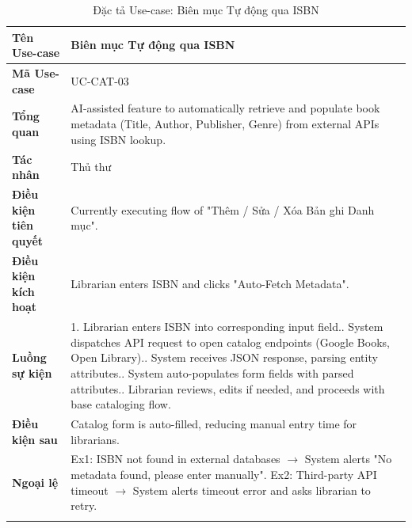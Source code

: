 \begin{longtable}{|p{3.5cm}|p{11.5cm}|}
    \hline
    \textbf{Tên Use-case} & \textbf{Biên mục Tự động qua ISBN} \\
    \hline
    \textbf{Mã Use-case} & UC-CAT-03 \\
    \hline
    \textbf{Tổng quan} & AI-assisted feature to automatically retrieve and populate book metadata (Title, Author, Publisher, Genre) from external APIs using ISBN lookup. \\
    \hline
    \textbf{Tác nhân} & Thủ thư \\
    \hline
    \textbf{Điều kiện tiên quyết} & Currently executing flow of "Thêm / Sửa / Xóa Bản ghi Danh mục". \\
    \hline
    \textbf{Điều kiện kích hoạt} & Librarian enters ISBN and clicks "Auto-Fetch Metadata". \\
    \hline
    \textbf{Luồng sự kiện} & 
    1. Librarian enters ISBN into corresponding input field.\newline
    2. System dispatches API request to open catalog endpoints (Google Books, Open Library).\newline
    3. System receives JSON response, parsing entity attributes.\newline
    4. System auto-populates form fields with parsed attributes.\newline
    5. Librarian reviews, edits if needed, and proceeds with base cataloging flow. \\
    \hline
    \textbf{Điều kiện sau} & Catalog form is auto-filled, reducing manual entry time for librarians. \\
    \hline
    \textbf{Ngoại lệ} & 
    Ex1: ISBN not found in external databases $\rightarrow$ System alerts "No metadata found, please enter manually".\newline
    Ex2: Third-party API timeout $\rightarrow$ System alerts timeout error and asks librarian to retry. \\
    \hline
    \caption{Đặc tả Use-case: Biên mục Tự động qua ISBN}
\end{longtable}

